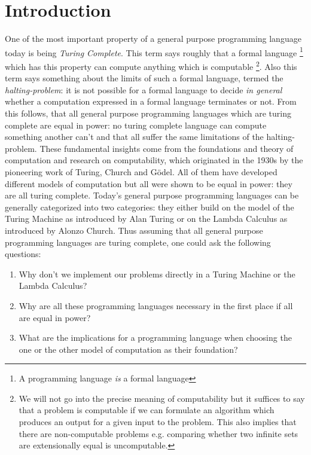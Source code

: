 \chapter{Introduction}
One of the most important property of a general purpose programming language today is being \textit{Turing Complete}. This term says roughly that a formal language \footnote{A programming language \textit{is} a formal language} which has this property can compute anything which is computable \footnote{We will not go into the precise meaning of computability but it suffices to say that a problem is computable if we can formulate an algorithm which produces an output for a given input to the problem. This also implies that there are non-computable problems e.g. comparing whether two infinite sets are extensionally equal is uncomputable.}. Also this term says something about the limits of such a formal language, termed the \textit{halting-problem}: it is not possible for a formal language to decide \textit{in general} whether a computation expressed in a formal language terminates or not. From this follows, that all general purpose programming languages which are turing complete are equal in power: no turing complete language can compute something another can't and that all suffer the same limitations of the halting-problem.
These fundamental insights come from the foundations and theory of computation and research on computability, which originated in the 1930s by the pioneering work of Turing, Church and Gödel. All of them have developed different models of computation but all were shown to be equal in power: they are all turing complete.
Today's general purpose programming languages can be generally categorized into two categories: they either build on the model of the Turing Machine as introduced by Alan Turing or on the Lambda Calculus as introduced by Alonzo Church.
Thus assuming that all general purpose programming languages are turing complete, one could ask the following questions: 

\begin{enumerate}
	\item Why don't we implement our problems directly in a Turing Machine or the Lambda Calculus?
		
	\item Why are all these programming languages necessary in the first place if all are equal in power?

	\item What are the implications for a programming language when choosing the one or the other model of computation as their foundation?
\end{enumerate}

